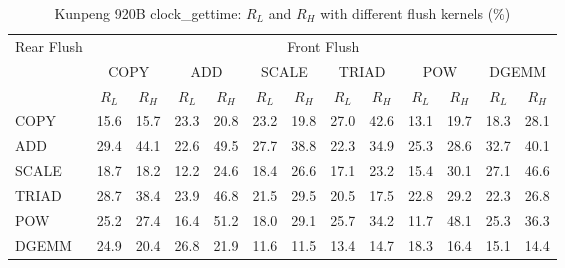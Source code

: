 \begin{table}[htbp]
\centering
\caption{Kunpeng 920B clock\_gettime: $R_L$ and $R_H$ with different flush kernels (\%)}
\label{tab:frkern-c920bn3-clock_gettime}
\begin{tabular*}{\textwidth}{@{\extracolsep{\fill}}lcccccccccccc}
\toprule
\multirow{3}{*}{Rear Flush} & \multicolumn{12}{c}{Front Flush} \\ \cmidrule(lr){2-13}
& \multicolumn{2}{c}{COPY} & \multicolumn{2}{c}{ADD} & \multicolumn{2}{c}{SCALE} & \multicolumn{2}{c}{TRIAD} & \multicolumn{2}{c}{POW} & \multicolumn{2}{c}{DGEMM} \\ \cmidrule(lr){2-3} \cmidrule(lr){4-5} \cmidrule(lr){6-7} \cmidrule(lr){8-9} \cmidrule(lr){10-11} \cmidrule(lr){12-13}
& $R_L$ & $R_H$ & $R_L$ & $R_H$ & $R_L$ & $R_H$ & $R_L$ & $R_H$ & $R_L$ & $R_H$ & $R_L$ & $R_H$ \\ \midrule
COPY & 15.6 & 15.7 & 23.3 & 20.8 & 23.2 & 19.8 & 27.0 & 42.6 & 13.1 & 19.7 & 18.3 & 28.1 \\
ADD & 29.4 & 44.1 & 22.6 & 49.5 & 27.7 & 38.8 & 22.3 & 34.9 & 25.3 & 28.6 & 32.7 & 40.1 \\
SCALE & 18.7 & 18.2 & 12.2 & 24.6 & 18.4 & 26.6 & 17.1 & 23.2 & 15.4 & 30.1 & 27.1 & 46.6 \\
TRIAD & 28.7 & 38.4 & 23.9 & 46.8 & 21.5 & 29.5 & 20.5 & 17.5 & 22.8 & 29.2 & 22.3 & 26.8 \\
POW & 25.2 & 27.4 & 16.4 & 51.2 & 18.0 & 29.1 & 25.7 & 34.2 & 11.7 & 48.1 & 25.3 & 36.3 \\
DGEMM & 24.9 & 20.4 & 26.8 & 21.9 & 11.6 & 11.5 & 13.4 & 14.7 & 18.3 & 16.4 & 15.1 & 14.4 \\
\bottomrule
\end{tabular*}
\end{table}